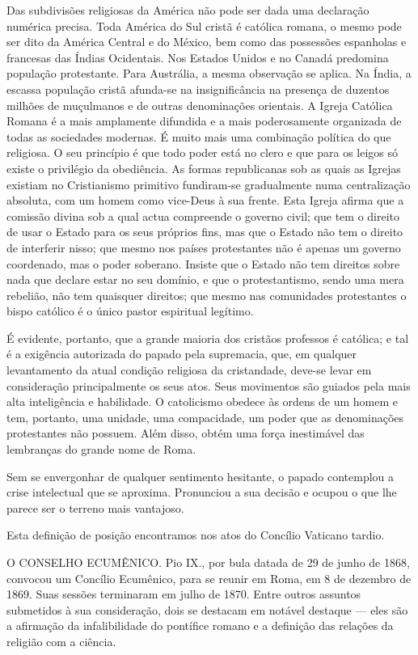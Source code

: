 \documentclass[11pt,a5paper,twoside,openany]{book}
\begin{document}
Das subdivisões religiosas da América não pode ser dada uma declaração numérica precisa. Toda América do Sul cristã é católica romana, o mesmo pode ser dito da América Central e do México, bem como das possessões espanholas e francesas das Índias Ocidentais. Nos Estados Unidos e no Canadá predomina população protestante. Para Austrália, a mesma observação se aplica. Na Índia, a escassa população cristã afunda-se na insignificância na presença de duzentos milhões de muçulmanos e de outras denominações orientais. A Igreja Católica Romana é a mais amplamente difundida e a mais poderosamente organizada de todas as sociedades modernas. É muito mais uma combinação política do que religiosa. O seu princípio é que todo poder está no clero e que para os leigos só existe o privilégio da obediência. As formas republicanas sob as quais as Igrejas existiam no Cristianismo primitivo fundiram-se gradualmente numa centralização absoluta, com um homem como vice-Deus à sua frente. Esta Igreja afirma que a comissão divina sob a qual actua compreende o governo civil; que tem o direito de usar o Estado para os seus próprios fins, mas que o Estado não tem o direito de interferir nisso; que mesmo nos países protestantes não é apenas um governo coordenado, mas o poder soberano. Insiste que o Estado não tem direitos sobre nada que declare estar no seu domínio, e que o protestantismo, sendo uma mera rebelião, não tem quaisquer direitos; que mesmo nas comunidades protestantes o bispo católico é o único pastor espiritual legítimo.

É evidente, portanto, que a grande maioria dos cristãos professos é católica; e tal é a exigência autorizada do papado pela supremacia, que, em qualquer levantamento da atual condição religiosa da cristandade, deve-se levar em consideração principalmente os seus atos. Seus movimentos são guiados pela mais alta inteligência e habilidade. O catolicismo obedece às ordens de um homem e tem, portanto, uma unidade, uma compacidade, um poder que as denominações protestantes não possuem. Além disso, obtém uma força inestimável das lembranças do grande nome de Roma.

Sem se envergonhar de qualquer sentimento hesitante, o papado contemplou a crise intelectual que se aproxima. Pronunciou a sua decisão e ocupou o que lhe parece ser o terreno mais vantajoso.

Esta definição de posição encontramos nos atos do Concílio Vaticano tardio.

O CONSELHO ECUMÊNICO. Pio IX., por bula datada de 29 de junho de 1868, convocou um Concílio Ecumênico, para se reunir em Roma, em 8 de dezembro de 1869. Suas sessões terminaram em julho de 1870. Entre outros assuntos submetidos à sua consideração, dois se destacam em notável destaque — eles são a afirmação da infalibilidade do pontífice romano e a definição das relações da religião com a ciência.
\end{document}
